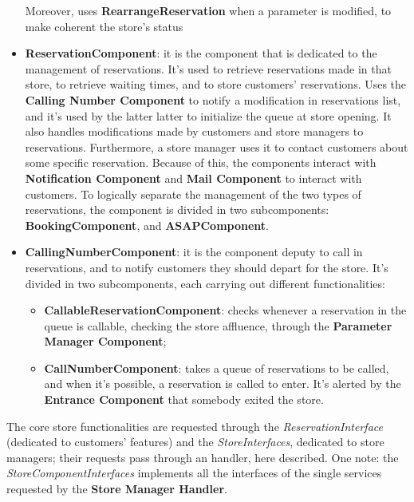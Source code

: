\documentclass{article}
\begin{document}
\begin{itemize}
				Moreover, uses {\bfseries RearrangeReservation} when a parameter is modified, to make coherent the store’s status
				
				\item {\bfseries ReservationComponent}: it is the component that is dedicated to the management of reservations. It’s used to retrieve reservations made in that store, to retrieve waiting times, and to store customers’ reservations. Uses the {\bfseries Calling Number Component} to notify a modification in reservations list, and it’s used by the latter latter to initialize the queue at store opening. It also handles modifications made by customers and store managers to reservations. Furthermore, a store manager uses it to contact customers about some specific reservation. Because of this, the components interact with {\bfseries Notification Component} and {\bfseries Mail Component} to interact with customers. 
				To logically separate the management of the two types of reservations, the component is divided in two subcomponents: {\bfseries BookingComponent}, and {\bfseries ASAPComponent}.
				
				\item {\bfseries CallingNumberComponent}: it is the component deputy to call in reservations, and to notify customers they should depart for the store. It’s divided in two subcomponents, each carrying out different functionalities:
				
				\begin{itemize}
					\item {\bfseries CallableReservationComponent}: checks whenever a reservation in the queue is callable, checking the store affluence, through the {\bfseries Parameter Manager Component};
					
					\item {\bfseries CallNumberComponent}: takes a queue of reservations to be called, and when it’s possible, a reservation is called to enter. It’s alerted by the {\bfseries Entrance Component} that somebody exited the store.
				\end{itemize}
			\end{itemize}
		
			The core store functionalities are requested through the \emph{ReservationInterface} (dedicated to customers’ features) and the \emph{StoreInterfaces}, dedicated to store managers; their requests pass through an handler, here described. One note: the \emph{StoreComponentInterfaces} implements all the interfaces of the single services requested by the {\bfseries Store Manager Handler}.
			
\end{document}
